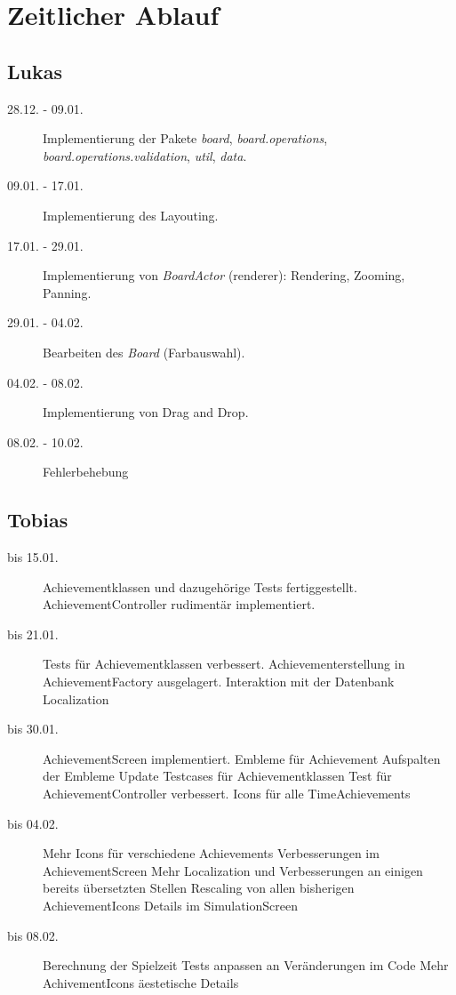\chapter{Zeitlicher Ablauf}

\section{Lukas}
\begin{description}
\item[28.12. - 09.01.]
Implementierung der Pakete \emph{board}, \emph{board.operations}, \emph{board.operations.validation}, \emph{util}, \emph{data}.
\item[09.01. - 17.01.]
Implementierung des Layouting.
\item[17.01. - 29.01.]
Implementierung von \emph{BoardActor} (renderer): Rendering, Zooming, Panning.
\item[29.01. - 04.02.]
Bearbeiten des \emph{Board} (Farbauswahl).
\item[04.02. - 08.02.]
Implementierung von Drag and Drop.
\item[08.02. - 10.02.]
Fehlerbehebung
\end{description}

\section{Tobias}
\begin{description}
\item[bis 15.01.]
Achievementklassen und dazugehörige Tests fertiggestellt.
AchievementController rudimentär implementiert.
\item[bis 21.01.]
Tests für Achievementklassen verbessert.
Achievementerstellung in AchievementFactory ausgelagert.
Interaktion mit der Datenbank
Localization
\item[bis 30.01.]
AchievementScreen implementiert.
Embleme für Achievement
Aufspalten der Embleme
Update Testcases für Achievementklassen
Test für AchievementController verbessert.
Icons für alle TimeAchievements
\item[bis 04.02.]
Mehr Icons für verschiedene Achievements
Verbesserungen im AchievementScreen
Mehr Localization und Verbesserungen an einigen bereits übersetzten Stellen
Rescaling von allen bisherigen AchievementIcons
Details im SimulationScreen
\item[bis 08.02.]
Berechnung der Spielzeit
Tests anpassen an Veränderungen im Code
Mehr AchivementIcons
äestetische Details
\end{description}

